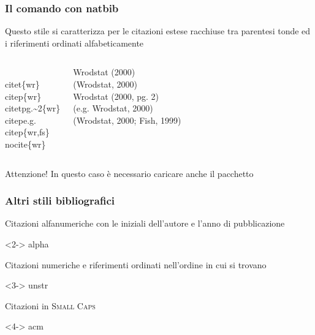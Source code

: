\begin{frame}
  \frametitle{Il comando  con natbib}
	Questo stile si caratterizza per le citazioni estese racchiuse tra parentesi tonde ed i riferimenti ordinati alfabeticamente %
	\begin{columns}
		\begin{LaTeXcode}
		\\citet\{wr\}\n  
		\\citep\{wr\}\n 
		\\citet\ls pg.\textasciitilde2\rs\{wr\}\n 
		\\citep\ls e.g.\rs\ls\rs\n 
		\\citep\{wr,fs\}\n 
		\\nocite\{wr\}
		\end{LaTeXcode}
	  \column[t]{.55\textwidth}
		\begin{LaTeXoutput} %
		Wrodstat (2000)\\
		(Wrodstat, 2000)\\
		Wrodstat (2000, pg. 2)\\
		(e.g. Wrodstat, 2000)\\
		(Wrodstat, 2000; Fish, 1999)\\
		\ \\
		\end{LaTeXoutput}
	\end{columns}
	\begin{block}{Attenzione!}
	In questo caso \`e necessario caricare anche il pacchetto \Lsty{natbib}
	\end{block}
\end{frame}
\begin{frame}
  \frametitle{Altri stili bibliografici}
	Citazioni alfanumeriche con le iniziali dell'autore e l'anno di pubblicazione
	\begin{LaTeXcode}<2->
		alpha
	\end{LaTeXcode}
	Citazioni numeriche e riferimenti ordinati nell'ordine in cui si trovano
	\begin{LaTeXcode}<3->
		unstr
	\end{LaTeXcode}
	Citazioni in \textsc{Small Caps}
	\begin{LaTeXcode}<4->
		acm
	\end{LaTeXcode}
\end{frame}

